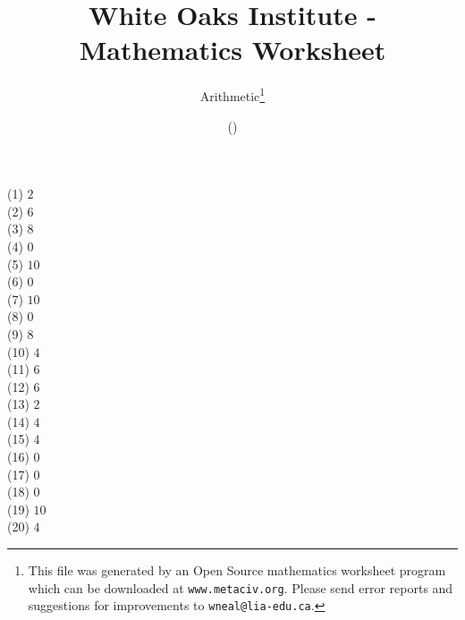 \documentclass[letter]{article}
\begin{document}
\title{White Oaks Institute - Mathematics Worksheet}
\author{Arithmetic\thanks{This file was generated by an \textsf{Open Source} mathematics worksheet program which can be downloaded at \texttt{www.metaciv.org}. Please send error reports and suggestions for improvements to \texttt{wneal@lia-edu.ca}.}}
\date{\XCfileversion{} (\XCfiledate)}
\maketitle
\setlength{\parskip}{12mm plus 4mm minus 4mm}\setlength{\parindent}{0cm}\begin{multicols}{2}(1) $2$\\(2) $6$\\(3) $8$\\(4) $0$\\(5) $10$\\(6) $0$\\(7) $10$\\(8) $0$\\(9) $8$\\(10) $4$\\(11) $6$\\(12) $6$\\(13) $2$\\(14) $4$\\(15) $4$\\(16) $0$\\(17) $0$\\(18) $0$\\(19) $10$\\(20) $4$\\\end{multicols}
\end{document}
